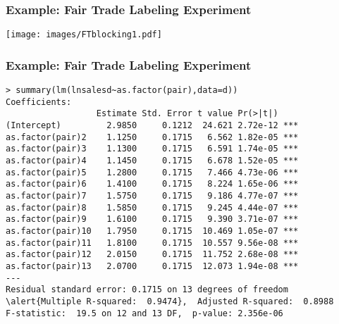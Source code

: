 \documentclass{beamer}
\numberwithin{equation}{section}
\begin{document}
\begin{frame}
  \frametitle{Example: Fair Trade Labeling Experiment}
  \centering
  \texttt{[image: images/FTblocking1.pdf]}
\end{frame}

\begin{frame}[fragile]
\frametitle{Example: Fair Trade Labeling Experiment}
{
\footnotesize
\begin{Verbatim}[frame=single, label=R Code, commandchars=\\\{\}]
> summary(lm(lnsalesd~as.factor(pair),data=d))
Coefficients:
                  Estimate Std. Error t value Pr(>|t|)    
(Intercept)         2.9850     0.1212  24.621 2.72e-12 ***
as.factor(pair)2    1.1250     0.1715   6.562 1.82e-05 ***
as.factor(pair)3    1.1300     0.1715   6.591 1.74e-05 ***
as.factor(pair)4    1.1450     0.1715   6.678 1.52e-05 ***
as.factor(pair)5    1.2800     0.1715   7.466 4.73e-06 ***
as.factor(pair)6    1.4100     0.1715   8.224 1.65e-06 ***
as.factor(pair)7    1.5750     0.1715   9.186 4.77e-07 ***
as.factor(pair)8    1.5850     0.1715   9.245 4.44e-07 ***
as.factor(pair)9    1.6100     0.1715   9.390 3.71e-07 ***
as.factor(pair)10   1.7950     0.1715  10.469 1.05e-07 ***
as.factor(pair)11   1.8100     0.1715  10.557 9.56e-08 ***
as.factor(pair)12   2.0150     0.1715  11.752 2.68e-08 ***
as.factor(pair)13   2.0700     0.1715  12.073 1.94e-08 ***
---
Residual standard error: 0.1715 on 13 degrees of freedom
\alert{Multiple R-squared:  0.9474},  Adjusted R-squared:  0.8988 
F-statistic:  19.5 on 12 and 13 DF,  p-value: 2.356e-06
\end{Verbatim}
}
\end{frame}
\end{document}
